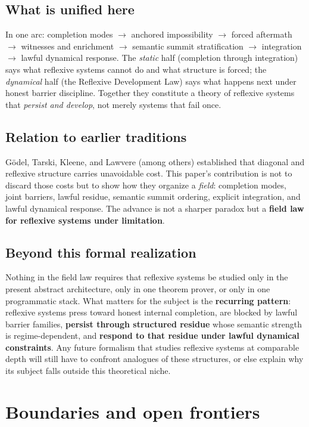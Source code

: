 \documentclass[11pt]{article}
\theoremstyle{plain}
\theoremstyle{definition}
\theoremstyle{remark}
\begin{document}
\subsection{What is unified here}

In one arc: completion modes \(\to\) anchored impossibility \(\to\) forced aftermath \(\to\) witnesses and enrichment \(\to\) semantic summit stratification \(\to\) integration \(\to\) lawful dynamical response. The \emph{static} half (completion through integration) says what reflexive systems cannot do and what structure is forced; the \emph{dynamical} half (the Reflexive Development Law) says what happens next under honest barrier discipline. Together they constitute a theory of reflexive systems that \emph{persist and develop}, not merely systems that fail once.

\subsection{Relation to earlier traditions}

Gödel, Tarski, Kleene, and Lawvere (among others) established that diagonal and reflexive structure carries unavoidable cost. This paper's contribution is not to discard those costs but to show how they organize a \emph{field}: completion modes, joint barriers, lawful residue, semantic summit ordering, explicit integration, and lawful dynamical response. The advance is not a sharper paradox but a \textbf{field law for reflexive systems under limitation}.

\subsection{Beyond this formal realization}

Nothing in the field law requires that reflexive systems be studied only in the present abstract architecture, only in one theorem prover, or only in one programmatic stack. What matters for the subject is the \textbf{recurring pattern}: reflexive systems press toward honest internal completion, are blocked by lawful barrier families, \textbf{persist through structured residue} whose semantic strength is regime-dependent, and \textbf{respond to that residue under lawful dynamical constraints}. Any future formalism that studies reflexive systems at comparable depth will still have to confront analogues of these structures, or else explain why its subject falls outside this theoretical niche.

\section{Boundaries and open frontiers}
\end{document}
